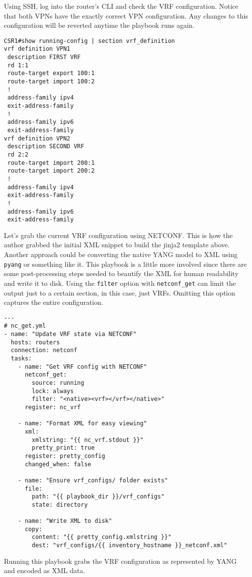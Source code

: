 Using SSH, log into the router's CLI and check the VRF configuration. Notice
that both VPNs have the exactly correct VPN configuration. Any changes to
this configuration will be reverted anytime the playbook runs again.

\begin{verbatim}
CSR1#show running-config | section vrf_definition
vrf definition VPN1
 description FIRST VRF
 rd 1:1
 route-target export 100:1
 route-target import 100:2
 !
 address-family ipv4
 exit-address-family
 !
 address-family ipv6
 exit-address-family
vrf definition VPN2
 description SECOND VRF
 rd 2:2
 route-target import 200:1
 route-target import 200:2
 !
 address-family ipv4
 exit-address-family
 !
 address-family ipv6
 exit-address-family
\end{verbatim}

Let's grab the current VRF configuration using NETCONF\@. This is how the author
grabbed the initial XML snippet to build the jinja2 template above. Another
approach could be converting the native YANG model to XML using \verb|pyang| or
something like it. This playbook is a little more involved since there are
some post-processing steps needed to beautify the XML for human readability
and write it to disk. Using the \verb|filter| option with \verb|netconf_get|
can limit the output just to a certain section, in this case, just VRFs.
Omitting this option captures the entire configuration.

\begin{verbatim}
---
# nc_get.yml
- name: "Update VRF state via NETCONF"
  hosts: routers
  connection: netconf
  tasks:
    - name: "Get VRF config with NETCONF"
      netconf_get:
        source: running
        lock: always
        filter: "<native><vrf></vrf></native>"
      register: nc_vrf

    - name: "Format XML for easy viewing"
      xml:
        xmlstring: "{{ nc_vrf.stdout }}"
        pretty_print: true
      register: pretty_config
      changed_when: false

    - name: "Ensure vrf_configs/ folder exists"
      file:
        path: "{{ playbook_dir }}/vrf_configs"
        state: directory

    - name: "Write XML to disk"
      copy:
        content: "{{ pretty_config.xmlstring }}"
        dest: "vrf_configs/{{ inventory_hostname }}_netconf.xml"
\end{verbatim}

Running this playbook grabs the VRF configuration as represented by YANG
and encoded as XML data.

